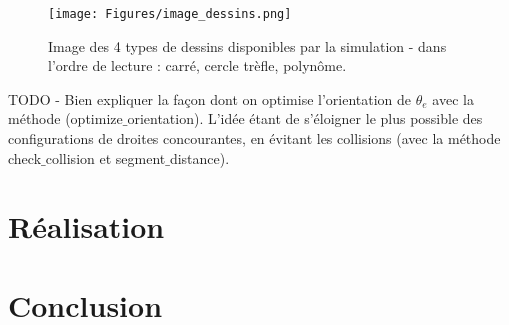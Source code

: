 \documentclass[a4paper, 11pt]{report}
\begin{document}
\begin{figure}[!htb]
    \centering
    \texttt{[image: Figures/image\_dessins.png]}
    \caption{Image des 4 types de dessins disponibles par la simulation - dans l'ordre de lecture : carré, cercle trèfle, polynôme.}
    \label{fig:dessins}
\end{figure}

TODO - Bien expliquer la façon dont on optimise l'orientation de $\theta_e$ avec la méthode  (optimize$\_$orientation). L'idée étant de s'éloigner le plus possible des configurations de droites concourantes, en évitant les collisions (avec la méthode check$\_$collision et segment$\_$distance).

\section{Réalisation}

\section*{Conclusion}


\newpage
\nocite{*}
\printbibliography
\end{document}
